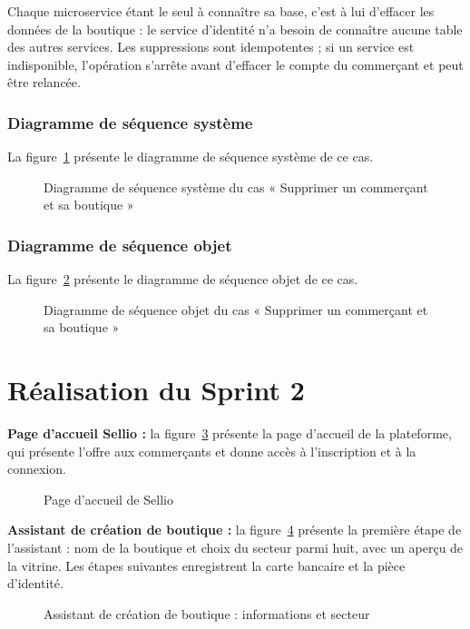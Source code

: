 Chaque microservice étant le seul à connaître sa base, c'est à lui d'effacer les données de la boutique : le service d'identité n'a besoin de connaître aucune table des autres services. Les suppressions sont idempotentes ; si un service est indisponible, l'opération s'arrête avant d'effacer le compte du commerçant et peut être relancée.

\subsubsection{Diagramme de séquence système}
La figure~\ref{fig:dss-suppression} présente le diagramme de séquence système de ce cas.
\begin{figure}[H]
    \centering
    \caption{Diagramme de séquence système du cas « Supprimer un commerçant et sa boutique »}
    \label{fig:dss-suppression}
\end{figure}

\subsubsection{Diagramme de séquence objet}
La figure~\ref{fig:dso-suppression} présente le diagramme de séquence objet de ce cas.
\begin{figure}[H]
    \centering
    \caption{Diagramme de séquence objet du cas « Supprimer un commerçant et sa boutique »}
    \label{fig:dso-suppression}
\end{figure}

\section{Réalisation du Sprint 2}
\textbf{Page d'accueil Sellio :} la figure~\ref{fig:ui-sellio-home} présente la page d'accueil de la plateforme, qui présente l'offre aux commerçants et donne accès à l'inscription et à la connexion.
\begin{figure}[H]
    \centering
    \caption{Page d'accueil de Sellio}
    \label{fig:ui-sellio-home}
\end{figure}

\textbf{Assistant de création de boutique :} la figure~\ref{fig:ui-wizard-1} présente la première étape de l'assistant : nom de la boutique et choix du secteur parmi huit, avec un aperçu de la vitrine. Les étapes suivantes enregistrent la carte bancaire et la pièce d'identité.
\begin{figure}[H]
    \centering
    \caption{Assistant de création de boutique : informations et secteur}
    \label{fig:ui-wizard-1}
\end{figure}

